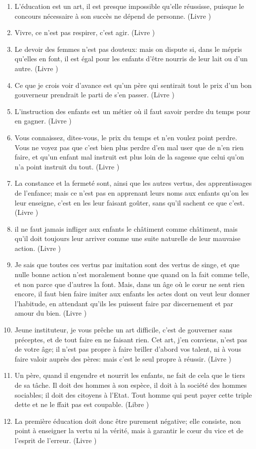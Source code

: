 \documentclass[a4paper, 11pt, hidelinks]{article}
\newcommand{\rb}[1]{\Romanbar{#1}}
\begin{document}
\begin{enumerate}
    \item L'éducation est un art, il est presque impossible qu'elle réussisse, puisque le concours nécessaire à son succès ne dépend de personne. (Livre \rb{1})
    \item Vivre, ce n'est pas respirer, c'est agir. (Livre \rb{1})
    \item Le devoir des femmes n'est pas douteux: mais on dispute si, dans le mépris qu'elles en font, il est égal pour les enfants d'être nourris de leur lait ou d'un autre. (Livre \rb{1})
    \item Ce que je crois voir d'avance est qu'un père qui sentirait tout le prix d'un bon gouverneur prendrait le parti de s'en passer. (Livre \rb{1})
    \item L'instruction des enfants est un métier où il faut savoir perdre du temps pour en gagner. (Livre \rb{2})
    \item Vous connaissez, dites-vous, le prix du temps et n'en voulez point perdre. Vous ne voyez pas que c'est bien plus perdre d'en mal user que de n'en rien faire, et qu'un enfant mal instruit est plus loin de la sagesse que celui qu'on n'a point instruit du tout. (Livre \rb{2})
    \item La constance et la fermeté sont, ainsi que les autres vertus, des apprentissages de l'enfance; mais ce n'est pas en apprenant leurs noms aux enfants qu'on les leur enseigne, c'est en les leur faisant goûter, sans qu'il sachent ce que c'est. (Livre \rb{2})
    \item il ne faut jamais infliger aux enfants le châtiment comme châtiment, mais qu'il doit toujours leur arriver comme une suite naturelle de leur mauvaise action. (Livre \rb{2})
    \item Je sais que toutes ces vertus par imitation sont des vertus de singe, et que nulle bonne action n'est moralement bonne que quand on la fait comme telle, et non parce que d'autres la font. Mais, dans un âge où le c\oe ur ne sent rien encore, il faut bien faire imiter aux enfants les actes dont on veut leur donner l'habitude, en attendant qu'ils les puissent faire par discernement et par amour du bien. (Livre \rb{2})
    \item Jeune instituteur, je vous prêche un art difficile, c'est de gouverner sans préceptes, et de tout faire en ne faisant rien. Cet art, j'en conviens, n'est pas de votre âge; il n'est pas propre à faire briller d'abord vos talent, ni à vous faire valoir auprès des pères: mais c'est le seul propre à réussir. (Livre \rb{2}) 
    \item Un père, quand il engendre et nourrit les enfants, ne fait de cela que le tiers de sa tâche. Il doit des hommes à son espèce, il doit à la société des hommes sociables; il doit des citoyens à l'Etat. Tout homme qui peut payer cette triple dette et ne le ffait pas est coupable. (Libre \rb{1})
    \item La première éducation doit donc être purement négative; elle consiste, non point à enseigner la vertu ni la vérité, mais à garantir le c\oe ur du vice et de l'esprit de l'erreur. (Livre \rb{2})
\end{enumerate}
\end{document}
